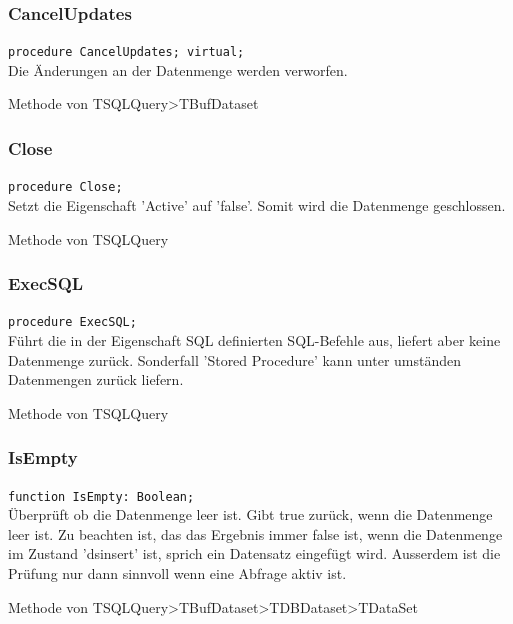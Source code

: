 \subsubsection{CancelUpdates}
\begin{description}
  \item \texttt{procedure CancelUpdates; virtual;}\\Die Änderungen an der Datenmenge werden verworfen.
  \begin{description}
    \item Methode von TSQLQuery>TBufDataset
  \end{description}
\end{description}

\subsubsection{Close}
\begin{description}
  \item \texttt{procedure Close;}\\
Setzt die Eigenschaft 'Active' auf 'false'. Somit wird die Datenmenge geschlossen.
  \begin{description}
    \item Methode von TSQLQuery
  \end{description}
\end{description}

\subsubsection{ExecSQL}
\begin{description}
  \item \texttt{procedure ExecSQL;}\\
Führt die in der Eigenschaft SQL definierten SQL-Befehle aus, liefert aber keine Datenmenge zurück. Sonderfall 'Stored Procedure' kann unter umständen Datenmengen zurück liefern. 
  \begin{description}
    \item Methode von TSQLQuery
  \end{description}
\end{description}

\subsubsection{IsEmpty}
\begin{description}
  \item \texttt{function IsEmpty: Boolean;}\\
Überprüft ob die Datenmenge leer ist. Gibt true zurück, wenn die Datenmenge leer ist. Zu beachten ist, das das Ergebnis immer false ist, wenn die Datenmenge im Zustand 'dsinsert' ist, sprich ein Datensatz eingefügt wird. Ausserdem ist die Prüfung nur dann sinnvoll wenn eine Abfrage aktiv ist.
  \begin{description}
    \item Methode von TSQLQuery>TBufDataset>TDBDataset>TDataSet
  \end{description}
\end{description}

